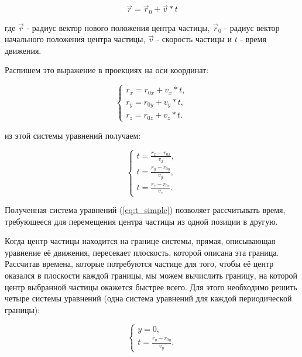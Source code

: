 \documentclass[a4paper]{article}
\begin{document}
\begin{equation}
\vec{r} = \vec{r}_0 + \vec{v}*t
\end{equation}

где $ \vec{r} $ - радиус вектор нового положения центра частицы, $ \vec{r}_0 $ - радиус вектор начального положения центра частицы, $ \vec{v} $ - скорость частицы и $ t $ - время движения.

Распишем это выражение в проекциях на оси координат:

\begin{equation}\label{eq:r_scalar}
    \begin{cases}
        r_x = r_{0x} + v_x * t,
        \\
        r_y = r_{0y} + v_y * t,
        \\
        r_z = r_{0z} + v_z * t.
    \end{cases}
\end{equation}

из этой системы уравнений получаем:

\begin{equation}\label{eq:t_simple}
    \begin{cases}
        t = \displaystyle\frac{r_x - r_{0x}}{v_x},
        \\
        t = \displaystyle\frac{r_y - r_{0y}}{v_y},
        \\
        t = \displaystyle\frac{r_z - r_{0z}}{v_z}.
    \end{cases}
\end{equation}

Полученная система уравнений (\ref{eq:t_simple}) позволяет рассчитывать время, требующееся для перемещения центра частицы из одной позиции в другую.

Когда центр частицы находится на границе системы, прямая, описывающая уравнение её движения, пересекает плоскость, которой описана эта граница. Рассчитав времена, которые потребуются частице для того, чтобы её центр оказался в плоскости каждой границы, мы можем вычислить границу, на которой центр выбранной частицы окажется быстрее всего. Для этого необходимо решить четыре системы уравнений (одна система уравнений для каждой периодической границы):

\begin{equation}
    \begin{cases}
        y = 0,
        \\
        t = \displaystyle\frac{r_y - r_{0y}}{v_y}.
    \end{cases}
\end{equation}
\end{document}
